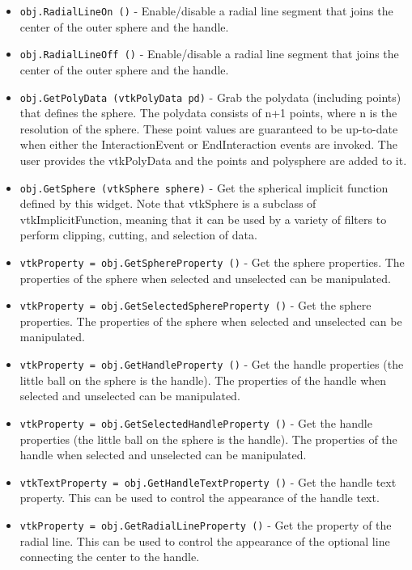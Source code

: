 \begin{itemize}
\item  \verb|obj.RadialLineOn ()| -  Enable/disable a radial line segment that joins the center of the
 outer sphere and the handle.

\item  \verb|obj.RadialLineOff ()| -  Enable/disable a radial line segment that joins the center of the
 outer sphere and the handle.

\item  \verb|obj.GetPolyData (vtkPolyData pd)| -  Grab the polydata (including points) that defines the sphere.  The
 polydata consists of n+1 points, where n is the resolution of the
 sphere. These point values are guaranteed to be up-to-date when either the
 InteractionEvent or EndInteraction events are invoked. The user provides
 the vtkPolyData and the points and polysphere are added to it.

\item  \verb|obj.GetSphere (vtkSphere sphere)| -  Get the spherical implicit function defined by this widget.  Note that
 vtkSphere is a subclass of vtkImplicitFunction, meaning that it can be
 used by a variety of filters to perform clipping, cutting, and selection
 of data.

\item  \verb|vtkProperty = obj.GetSphereProperty ()| -  Get the sphere properties. The properties of the sphere when selected 
 and unselected can be manipulated.

\item  \verb|vtkProperty = obj.GetSelectedSphereProperty ()| -  Get the sphere properties. The properties of the sphere when selected 
 and unselected can be manipulated.

\item  \verb|vtkProperty = obj.GetHandleProperty ()| -  Get the handle properties (the little ball on the sphere is the
 handle). The properties of the handle when selected and unselected
 can be  manipulated.

\item  \verb|vtkProperty = obj.GetSelectedHandleProperty ()| -  Get the handle properties (the little ball on the sphere is the
 handle). The properties of the handle when selected and unselected
 can be  manipulated.

\item  \verb|vtkTextProperty = obj.GetHandleTextProperty ()| -  Get the handle text property. This can be used to control the appearance 
 of the handle text.

\item  \verb|vtkProperty = obj.GetRadialLineProperty ()| -  Get the property of the radial line. This can be used to control the 
 appearance of the optional line connecting the center to the handle.


\end{itemize}
